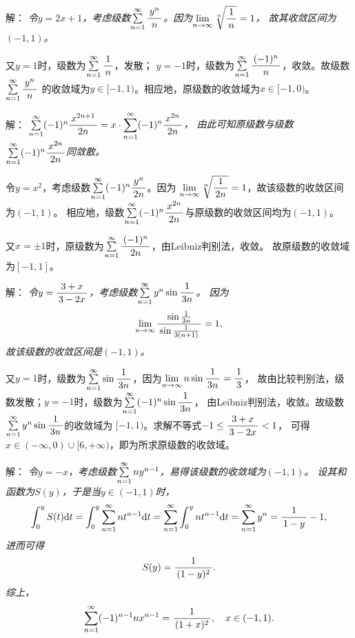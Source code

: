 \begin{frame}
	\linespread{1.5}
	
	
	\small 解：\it
	令$y=2x+1$，考虑级数$\sumn\df{y^n}n$。因为$\limn\sqrt[n]{\df1n}=1$，
	故其收敛区间为$(-1,1)$。
	
	又$y=1$时，级数为$\sumn\df1n$，发散；
	$y=-1$时，级数为$\sumn\df{(-1)^n}n$，收敛。故级数$\sumn\df{y^n}n$
	的收敛域为$y\in[-1,1)$。相应地，原级数的收敛域为$x\in[-1,0)$。
\end{frame}

\begin{frame}
	\linespread{1.5}
	
	
	\small 解：\it
	$\sumn(-1)^n\df{x^{2n+1}}{2n}=x\cdot\sumn(-1)^n\df{x^{2n}}{2n}$，
	由此可知原级数与级数$\sumn(-1)^n\df{x^{2n}}{2n}$同敛散。
	
	令$y=x^2$，考虑级数$\sumn(-1)^n\df{y^{n}}{2n}$。因为
	$\limn\sqrt[n]{\df1{2n}}=1$，故该级数的收敛区间为$(-1,1)$。
	相应地，级数$\sumn(-1)^n\df{x^{2n}}{2n}$与原级数的收敛区间均为$(-1,1)$。
	
	又$x=\pm1$时，原级数为$\sumn\df{(-1)^n}{2n}$，由Leibniz判别法，收敛。
	故原级数的收敛域为$[-1,1]$。
\end{frame}

\begin{frame}
	\linespread{1.5}
	
	
	\small 解：\it
	令$y=\df{3+x}{3-2x}$，考虑级数$\sumn y^n\sin\df1{3n}$。
	因为
	$$\limn\df{\sin\frac1{3n}}{\sin\frac1{3(n+1)}}=1,$$
	故该级数的收敛区间是$(-1,1)$。
	
	又$y=1$时，级数为$\sumn\sin\df1{3n}$，因为$\limn n\sin\df1{3n}=\df13$，
	故由比较判别法，级数发散；$y=-1$时，级数为$\sumn(-1)^n\sin\df1{3n}$，
	由Leibniz判别法，收敛。故级数$\sumn y^n\sin\df1{3n}$的收敛域为
	$[-1,1)$。求解不等式$-1\leq\df{3+x}{3-2x}<1$，
	可得$x\in(-\infty,0)\cup[6,+\infty)$，即为所求原级数的收敛域。\fin
\end{frame}

\begin{frame}
	\linespread{1.5}
	
	
	\small 解：\it
	令$y=-x$，考虑级数$\sumn ny^{n-1}$，易得该级数的收敛域为$(-1,1)$。
	设其和函数为$S(y)$，于是当$y\in(-1,1)$时，
	$$\dint_0^yS(t)\d t=\dint_0^y\sumn nt^{n-1}\d t
	=\sumn \dint_0^ynt^{n-1}\d t=\sumn y^n=\df1{1-y}-1,$$
	进而可得
	$$S(y)=\df1{(1-y)^2}.$$
	综上，
	$$\sumn(-1)^{n-1}nx^{n-1}=\df1{(1+x)^2},\quad x\in(-1,1).$$
\end{frame}

